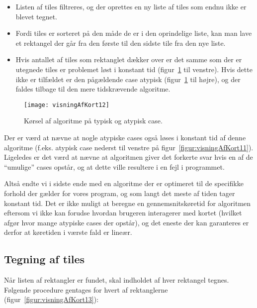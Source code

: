 \begin{itemize}
	\item Listen af tiles filtreres, og der oprettes en ny liste af tiles som endnu ikke er blevet tegnet.
	\item Fordi tiles er sorteret på den måde de er i den oprindelige liste, kan man lave et rektangel der går fra den første til den sidste tile fra den nye liste.
	\item Hvis antallet af tiles som rektanglet dækker over er det samme som der er utegnede tiles er problemet løst i konstant tid (figur~\ref{figur:visningAfKort12} til venstre). Hvis dette ikke er tilfældet er den pågældende case atypisk (figur~\ref{figur:visningAfKort12} til højre), og der faldes tilbage til den mere tidskrævende algoritme.
\end{itemize}

\begin{figure}[h]
	\centering
	\texttt{[image: visningAfKort12]}
	\captionsetup{width=0.8\textwidth}
	\caption{Kørsel af algoritme på typisk og atypisk case.}
	\label{figur:visningAfKort12}
\end{figure}

Der er værd at nævne at nogle atypiske cases også løses i konstant tid af denne algoritme (f.eks. atypisk case nederst til venstre på figur~\ref{figur:visningAfKort11}). Ligeledes er det værd at nævne at algoritmen giver det forkerte svar hvis en af de ``umulige'' cases opstår, og at dette ville resultere i en fejl i programmet.

Altså endte vi i sidste ende med en algoritme der er optimeret til de specifikke forhold der gælder for vores program, og som langt det meste af tiden tager konstant tid. Det er ikke muligt at beregne en gennemsnitskøretid for algoritmen eftersom vi ikke kan forudse hvordan brugeren interagerer med kortet (hvilket afgør hvor mange atypiske cases der opstår), og det eneste der kan garanteres er derfor at køretiden i værste fald er lineær.

\subsection{Tegning af tiles}
\label{subsec:tegningAfTiles}

Når listen af rektangler er fundet, skal indholdet af hver rektangel tegnes. Følgende procedure gentages for hvert af rektanglerne (figur~\ref{figur:visningAfKort13}):

